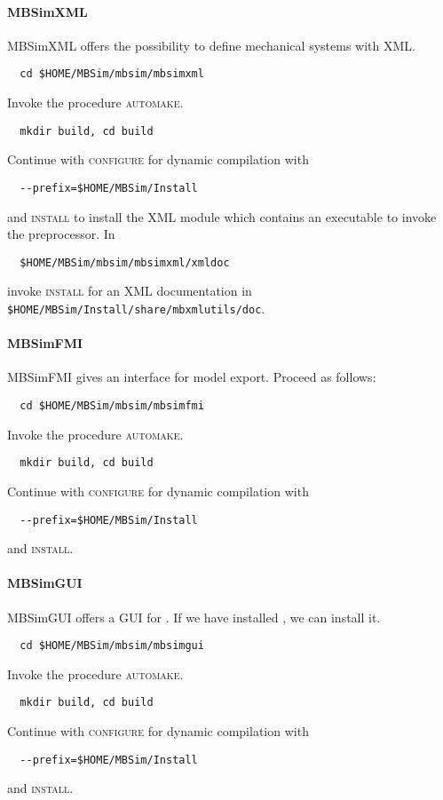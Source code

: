 \paragraph{MBSimXML}
MBSimXML offers the possibility to define mechanical systems with XML.
\begin{verbatim}
  cd $HOME/MBSim/mbsim/mbsimxml
\end{verbatim}
Invoke the procedure \textsc{automake}.
\begin{verbatim}
  mkdir build, cd build
\end{verbatim}
Continue with \textsc{configure} for dynamic compilation with
\begin{verbatim}
  --prefix=$HOME/MBSim/Install
\end{verbatim}
and \textsc{install} to install the XML module which contains an executable to invoke the preprocessor. In
\begin{verbatim}
  $HOME/MBSim/mbsim/mbsimxml/xmldoc
\end{verbatim}
invoke \textsc{install} for an XML documentation in\\
\texttt{\$HOME/MBSim/Install/share/mbxmlutils/doc}.
%
\paragraph{MBSimFMI}
MBSimFMI gives an interface for model export. Proceed as follows:
\begin{verbatim}
  cd $HOME/MBSim/mbsim/mbsimfmi
\end{verbatim}
Invoke the procedure \textsc{automake}.
\begin{verbatim}
  mkdir build, cd build
\end{verbatim}
Continue with \textsc{configure} for dynamic compilation with
\begin{verbatim}
  --prefix=$HOME/MBSim/Install
\end{verbatim}
and \textsc{install}.
%
\paragraph{MBSimGUI}
MBSimGUI offers a GUI for \MBSim{}. If we have installed \OpenMBV{}, we can install it.
\begin{verbatim}
  cd $HOME/MBSim/mbsim/mbsimgui
\end{verbatim}
Invoke the procedure \textsc{automake}.
\begin{verbatim}
  mkdir build, cd build
\end{verbatim}
Continue with \textsc{configure} for dynamic compilation with
\begin{verbatim}
  --prefix=$HOME/MBSim/Install
\end{verbatim}
and \textsc{install}.

